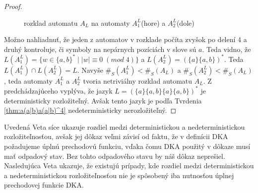 \begin{proof}
\begin{figure}[H]
\caption{rozklad automatu $ A_L $ na automaty $ A_1^L $(hore) a $ A_2^L $(dole)}
\end{figure}

Možno nahliadnuť, že jeden z automatov v rozklade počíta zvyšok po delení 4 a druhý kontroluje, či symboly na nepárnych pozíciách v slove sú $ a $. Teda vidno, že $ L(A_1^L) = \lbrace w \in \lbrace a,b \rbrace^* \; | \; |w| \equiv 0 \; (mod \; 4) \rbrace $ a $ L(A_2^L) = (\lbrace a \rbrace \lbrace a,b \rbrace)^* $. Teda $ L(A_1^L) \cap L(A_2^L) = L $. Navyše $ \#_S(A_1^L) < \#_S(A_L) $ a $ \#_S(A_2^L) < \#_S(A_L) $, teda automaty $ A_1^L $ a $ A_2^L $ tvoria netriviálny rozklad automatu $ A_L $. Z predchádzajúceho vyplýva, že jazyk $ L = (\lbrace a \rbrace \lbrace a,b \rbrace \lbrace a \rbrace \lbrace a,b \rbrace)^* $ je deterministicky rozložiteľný. Avšak tento jazyk je podľa Tvrdenia \ref{thm:a(a|b)a(a|b)^4} nedeterministicky nerozložiteľný.
\end{proof}

Uvedená Veta síce ukazuje rozdiel medzi deterministickou a nedeterministickou rozložiteľnosťou, avšak jej dôkaz veľmi závisí od faktu, že v definícii DKA požadujeme úplnú prechodovú funkciu, vďaka čomu DKA použitý v dôkaze musí mať odpadový stav. Bez tohto odpadového stavu by náš dôkaz neprešiel. Nasledujúca Veta ukazuje, že existujú prípady, kde rozdiel medzi deterministickou a nedeterministickou rozložiteľnosťou nie je spôsobený iba nutnosťou úplnej prechodovej funkcie DKA.

